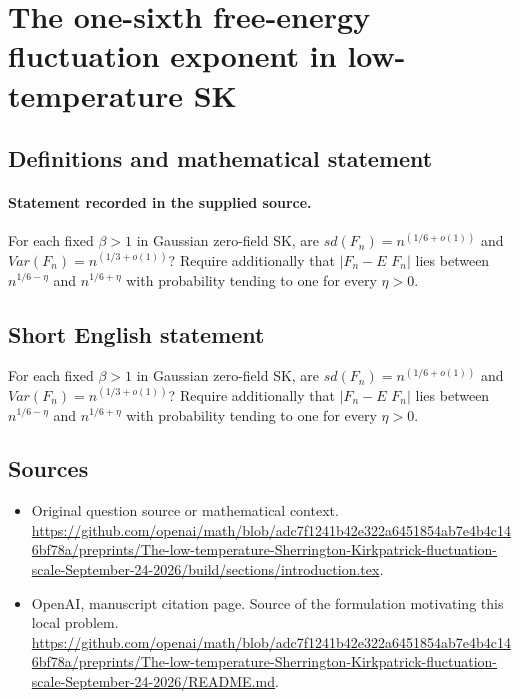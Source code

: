 \documentclass[11pt]{article}
\begin{document}
\section*{The one-sixth free-energy fluctuation exponent in low-temperature SK}\label{statement}
\subsection{Definitions and mathematical statement}
\paragraph{Statement recorded in the supplied source.}
For each fixed $\beta >1$ in Gaussian zero-field SK, are $sd(F_n)=n^(1/6+o(1))$ and $Var(F_n)=n^(1/3+o(1))$? Require additionally that $|F_n-E$ $F_n|$ lies between $n^{1/6-\eta }$ and $n^{1/6+\eta }$ with probability tending to one for every $\eta >0$.
\subsection{Short English statement}
For each fixed $\beta >1$ in Gaussian zero-field SK, are $sd(F_n)=n^(1/6+o(1))$ and $Var(F_n)=n^(1/3+o(1))$? Require additionally that $|F_n-E$ $F_n|$ lies between $n^{1/6-\eta }$ and $n^{1/6+\eta }$ with probability tending to one for every $\eta >0$.
\subsection{Sources}
\begin{itemize}
\item[S1] Original question source or mathematical context.
\url{https://github.com/openai/math/blob/adc7f1241b42e322a6451854ab7e4b4c146bf78a/preprints/The-low-temperature-Sherrington-Kirkpatrick-fluctuation-scale-September-24-2026/build/sections/introduction.tex}.
\item[S2] OpenAI, manuscript citation page. Source of the formulation motivating this local problem.
\url{https://github.com/openai/math/blob/adc7f1241b42e322a6451854ab7e4b4c146bf78a/preprints/The-low-temperature-Sherrington-Kirkpatrick-fluctuation-scale-September-24-2026/README.md}.
\end{itemize}
\end{document}

